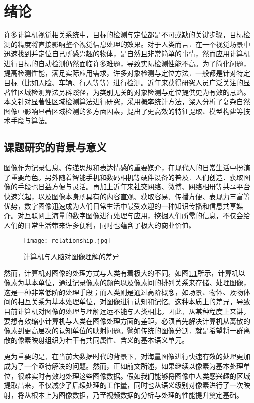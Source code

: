 
\chapter{绪论}
许多计算机视觉相关系统中，目标的检测与定位都是不可或缺的关键步骤，目标检测的精度将直接影响整个视觉信息处理的效果。对于人类而言，在一个视觉场景中迅速找到并定位自己所感兴趣的物体，是自然且非常简单的事情，然而应用计算机进行目标的自动检测仍然面临许多难题，导致实际检测性能不高。为了简化问题，提高检测性能，满足实际应用需求，许多对象检测与定位方法，一般都是针对特定目标（比如人脸、车辆、行人等等）进行检测。近年来获得研究人员广泛关注的显著性区域检测算法另辟蹊径，为类别无关的对象检测与定位提供更为有效的思路。本文针对显著性区域检测算法进行研究，采用概率统计方法，深入分析了复杂自然图像中影响显著区域检测的多方面因素，提出了更高效的特征提取、模型构建等技术手段与算法。

\section{课题研究的背景与意义}
图像作为记录信息、传递思想和表达情感的重要媒介，在现代人的日常生活中扮演了重要角色。另外随着智能手机和数码相机等硬件设备的普及，人们创造、获取图像的手段也日益方便与灵活。再加上近年来社交网络、微博、网络相册等共享平台快速兴起，以及图像本身所具有的内容直观、获取容易、传播方便、表现力丰富等优势，数字图像迅速成为人们日常生活中最受欢迎的一种知识传播和信息共享媒介\cite{CMM12THU}。对互联网上海量的数字图像进行处理与应用，挖掘人们所需的信息，不仅会给人们的日常生活带来许多便利，同时也蕴含了极大的商业价值。

\begin{figure}[h]
\centering
\texttt{[image: relationship.jpg]}
\caption{计算机与人脑对图像理解的差异} \label{fig:exttt}
\end{figure}

然而，计算机对图像的处理方式与人类有着极大的不同。如图\ref{fig:exttt}所示，计算机以像素为基本单位，通过记录像素的颜色以及像素间的排列关系来存储、处理图像，这是一种非常低阶的处理手段；而人类则是通过高阶概念，如场景、物体、及物体间的相互关系为基本处理单位，对图像进行认知和记忆。这种本质上的差异，导致目前计算机对图像的处理与理解远远不能与人类相比。因此，从某种程度上来讲，要想有效缩小计算机与人类在图像处理方面的差距，必须首先解决计算机从离散的像素到更高层次的认知单位的映射问题。譬如传统的图像分割，就是希望将一群离散的像素映射组织为若干有共同属性、含义的基本语义单元。

更为重要的是，在当前大数据时代的背景下，对海量图像进行快速有效的处理更加成为了一个亟待解决的问题。然而，正如前文所述，如果继续以像素为基本处理单位，很难实时有效地处理这些图像数据。假如我们能够将图像中人类感兴趣的区域提取出来，不仅减少了后续处理的工作量，同时也从语义级别对像素进行了一次映射，将从根本上为图像数据，乃至视频数据的分析与处理的性能提升奠定基础。


